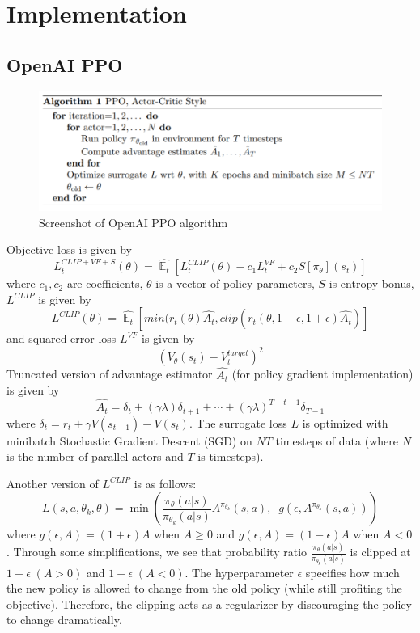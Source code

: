 \documentclass[lang=en,mode=normal,device=normal,color=blue,12pt]{elegantnote}
\DeclareMathOperator*{\E}{\mathbb{E}}
\DeclareMathOperator*{\1}{\mathbbm{1}}
\begin{document}
\newpage
\section{Implementation}

\subsection{OpenAI PPO}

\begin{figure}[!ht]
  \centering
  \includegraphics[width=0.7\linewidth]{ppo_openai.PNG}
  \caption{Screenshot of OpenAI PPO algorithm}
  \label{fig:ppo}
\end{figure}

Objective loss is given by
\[
L_t^{CLIP+VF+S}(\theta) = \hat{\E_t} [L_t^{CLIP}(\theta) - c_1 L_t^{VF} + c_2 S[\pi_\theta](s_t)]
\]
where $c_1,c_2$ are coefficients, $\theta$ is a vector of policy parameters, $S$ is entropy bonus, $L^{CLIP}$ is given by
\[
L^{CLIP}(\theta) = \hat{\E_t}[min(r_t(\theta)\hat{A_t},clip(r_t(\theta,1-\epsilon,1+\epsilon)\hat{A_t})]
\]
and squared-error loss $L^{VF}$ is given by
\[
(V_\theta(s_t) - V_t^{target})^2
\]
Truncated version of advantage estimator $\hat{A_t}$ (for policy gradient implementation) is given by
\[
\hat{A_t} = \delta_t + (\gamma \lambda)\delta_{t+1} + \cdots + (\gamma\lambda)^{T-t+1}\delta_{T-1}
\]
where $ \delta_t = r_t + \gamma V(s_{t+1}) - V(s_t) $.
The surrogate loss $L$ is optimized with minibatch Stochastic Gradient Descent (SGD) on $NT$ timesteps of data (where $N$ is the number of parallel actors and $T$ is timesteps).

Another version of $L^{CLIP}$ is as follows:
$$ L(s,a,\theta_k,\theta) = \min\left(
\frac{\pi_{\theta}(a|s)}{\pi_{\theta_k}(a|s)}  A^{\pi_{\theta_k}}(s,a), \;\;
g(\epsilon, A^{\pi_{\theta_k}}(s,a))
\right) $$
where $g(\epsilon,A) = (1+\epsilon)A$ when $A \geq 0$ and $g(\epsilon,A) = (1-\epsilon)A$ when $A < 0$. Through some simplifications, we see that probability ratio $\frac{\pi_{\theta}(a|s)}{\pi_{\theta_k}(a|s)}$ is clipped at $1+\epsilon\;(A>0)$ and $1-\epsilon\;(A<0)$. The hyperparameter $\epsilon$ specifies how much the new policy is allowed to change from the old policy (while still profiting the objective). Therefore, the clipping acts as a regularizer by discouraging the policy to change dramatically.
 
\end{document}
